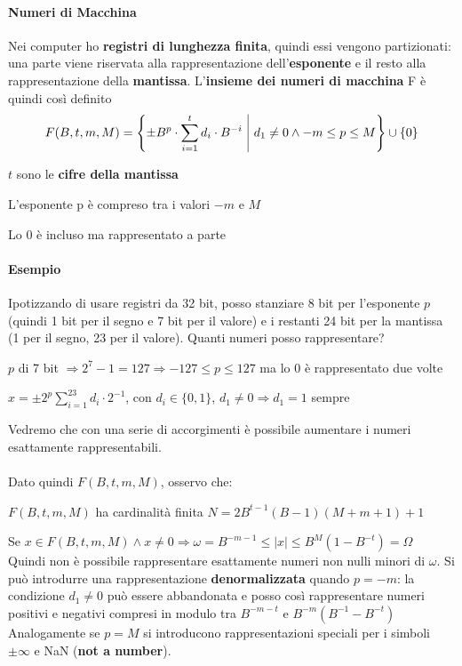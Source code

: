 \documentclass[10pt]{book}
\begin{document}
\paragraph{Numeri di Macchina} Nei computer ho \textbf{registri di lunghezza finita}, quindi essi vengono partizionati: una parte viene riservata alla rappresentazione dell'\textbf{esponente} e il resto alla rappresentazione della \textbf{mantissa}. L'\textbf{insieme dei numeri di macchina} F è quindi così definito
$$F(B, t, m, M) = \left\{\pm B^p \cdot \sum_{i=1}^t d_i \cdot B^{-i}\:\:\vline\:\: d_1 \neq 0 \wedge -m \leq p \leq M\right\} \cup \{0\}$$
\begin{list}{}{dove}
	\item $t$ sono le \textbf{cifre della mantissa}
	\item L'esponente p è compreso tra i valori $-m$ e $M$
	\item Lo 0 è incluso ma rappresentato a parte
\end{list}
\paragraph{Esempio} Ipotizzando di usare registri da 32 bit, posso stanziare 8 bit per l'esponente $p$ (quindi 1 bit per il segno e 7 bit per il valore) e i restanti 24 bit per la mantissa (1 per il segno, 23 per il valore). Quanti numeri posso rappresentare?
\begin{list}{}{}
	\item $p$ di 7 bit $\Rightarrow 2^7 - 1 = 127 \Rightarrow -127 \leq p \leq 127$ ma lo 0 è rappresentato due volte
	\item $x = \pm2^p \sum_{i=1}^23 d_i \cdot 2^{-1}$, con $d_i \in \{0, 1\}$, $d_1 \neq 0 \Rightarrow d_1 = 1$ sempre
\end{list}
Vedremo che con una serie di accorgimenti è possibile aumentare i numeri esattamente rappresentabili.\\\\
Dato quindi $F(B, t, m, M)$, osservo che:
\begin{list}{}{}
	\item $F(B, t, m, M)$ ha cardinalità finita $N = 2B^{t-1}(B - 1)(M + m + 1) + 1$
	\item Se $x \in F(B, t, m, M) \wedge x \neq 0 \Rightarrow \omega = B^{-m-1} \leq |x| \leq B^M(1 - B^{-t}) = \Omega$\\
	Quindi non è possibile rappresentare esattamente numeri non nulli minori di $\omega$. Si può introdurre una rappresentazione \textbf{denormalizzata} quando $p = -m$: la condizione $d_1 \neq 0$ può essere abbandonata e posso così rappresentare numeri positivi e negativi compresi in modulo tra $B^{-m-t}$ e $B^{-m}(B^{-1} - B^{-t})$\\
	Analogamente se $p = M$ si introducono rappresentazioni speciali per i simboli $\pm\infty$ e NaN (\textbf{not a number}).
\end{list}
\end{document}
